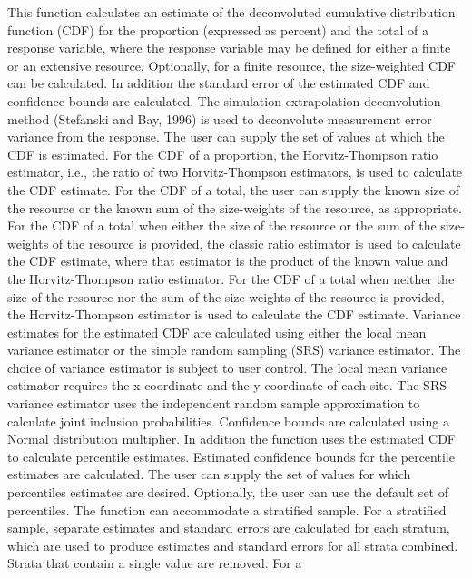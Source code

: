 \begin{Details}\relax
This function calculates an estimate of the deconvoluted cumulative 
distribution function (CDF) for the proportion (expressed as percent) and the 
total of a response  variable, where the response variable may be defined
for either a finite or an extensive resource.  Optionally, for a finite 
resource, the size-weighted CDF can be calculated.  In addition the standard 
error of the estimated CDF and confidence bounds are calculated.  The 
simulation extrapolation deconvolution method (Stefanski and Bay, 1996) is used 
to deconvolute measurement error variance from the response.  The user
can supply the set of values at which the CDF is estimated.  For the 
CDF of a proportion, the Horvitz-Thompson ratio estimator, i.e., the
ratio of two Horvitz-Thompson estimators, is used to calculate the CDF
estimate.  For the CDF of a total, the user can supply the known size of
the resource or the known sum of the size-weights of the resource, as
appropriate.  For the CDF of a total when either the size of the
resource or the sum of the size-weights of the resource is provided, the
classic ratio estimator is used to calculate the CDF estimate, where
that estimator is the product of the known value and the Horvitz-Thompson ratio
estimator.   For the CDF of a total when neither the size of the
resource nor the sum of the size-weights of the resource is provided, the
Horvitz-Thompson estimator is used to calculate the CDF estimate.
Variance estimates for the estimated CDF are calculated using either the
local mean variance estimator or the simple random sampling (SRS) 
variance estimator.  The choice of variance estimator is subject to user 
control. The local mean variance estimator requires the x-coordinate and
the y-coordinate of each site.  The SRS variance estimator uses
the independent random sample approximation to calculate joint inclusion
probabilities.  Confidence bounds are calculated using a Normal
distribution multiplier.  In addition the function uses the estimated 
CDF to calculate percentile estimates.  Estimated confidence bounds for
the percentile estimates are calculated.  The user can supply the set of values
for which percentiles estimates are desired.  Optionally, the user can use the
default set of percentiles.  The function can accommodate a stratified sample.
For a stratified sample, separate estimates and standard errors are calculated
for each stratum, which are used to produce estimates and standard errors for
all strata combined.  Strata that contain a single value are removed.  For a

\end{Details}
